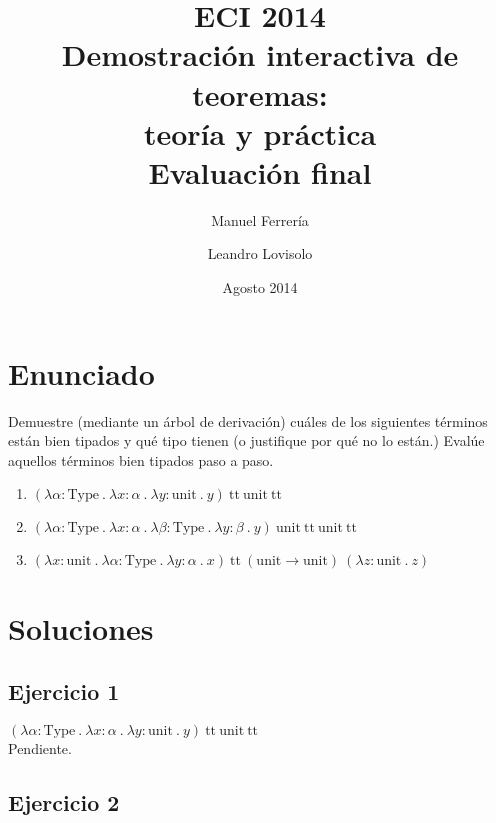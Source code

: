 \documentclass[a4paper]{article}
\begin{document}
\title{ECI 2014\\
       Demostración interactiva de teoremas:\\
       teoría y práctica\\[0.5\baselineskip]
       Evaluación final}
\author{Manuel Ferrería \and Leandro Lovisolo}
\date{Agosto 2014}
\maketitle

\section{Enunciado}
Demuestre (mediante un árbol de derivación) cuáles de los siguientes términos están bien tipados y qué tipo tienen (o justifique por qué no lo están.) Evalúe aquellos términos bien tipados paso a paso.

\begin{enumerate}
\item $(\lambda \alpha : \text{Type}\ .\
        \lambda x : \alpha\ .\
        \lambda y : \text{unit}\ .\
        y)\
       \text{tt}\ \text{unit}\ \text{tt}$
\item $(\lambda \alpha : \text{Type}\ .\
        \lambda x : \alpha\ .\
        \lambda \beta : \text{Type}\ .\
        \lambda y : \beta\ .\
        y)\
       \text{unit}\ \text{tt}\ \text{unit}\ \text{tt}$
\item $(\lambda x : \text{unit}\ .\
        \lambda \alpha : \text{Type}\ .\
        \lambda y : \alpha\ .\
        x)\
       \text{tt}\ (\text{unit} \rightarrow \text{unit})\
       (\lambda z : \text{unit}\ .\
        z)$
\end{enumerate}

\section{Soluciones}

\subsection{Ejercicio 1}

$(\lambda \alpha : \text{Type}\ .\
  \lambda x : \alpha\ .\
  \lambda y : \text{unit}\ .\
  y)\
 \text{tt}\ \text{unit}\ \text{tt}$\\

Pendiente.

\subsection{Ejercicio 2}
\end{document}
